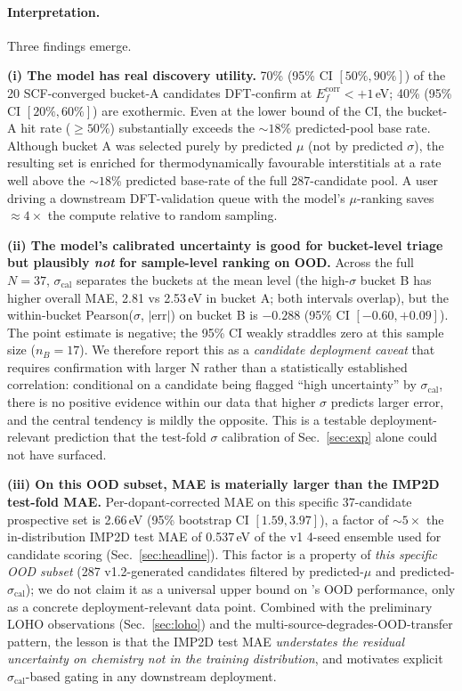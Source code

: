 \paragraph{Interpretation.}
Three findings emerge.

\textbf{(i) The model has real discovery utility.} 70\%
(95\% CI $[50\%, 90\%]$) of the 20 SCF-converged bucket-A candidates
DFT-confirm at $E_f^{\mathrm{corr}}<+1$\,eV; 40\% (95\% CI
$[20\%, 60\%]$) are exothermic. Even at the lower bound of the CI,
the bucket-A hit rate ($\ge 50\%$) substantially exceeds the
$\sim 18\%$ predicted-pool base rate. Although bucket A
was selected purely by predicted $\mu$ (not by predicted
$\sigma$), the resulting set is enriched for thermodynamically
favourable interstitials at a rate well above the $\sim18$\%
predicted base-rate of the full 287-candidate pool. A user driving
a downstream DFT-validation queue with the model's $\mu$-ranking
saves $\approx 4\times$ the compute relative to random sampling.

\textbf{(ii) The model's calibrated uncertainty is good for
bucket-level triage but plausibly \emph{not} for sample-level
ranking on OOD.} Across the full $N=37$, $\sigma_{\mathrm{cal}}$
separates the buckets at the mean level (the high-$\sigma$ bucket B
has higher overall MAE, 2.81 vs 2.53\,eV in bucket A; both intervals
overlap), but the within-bucket Pearson($\sigma$, $|\mathrm{err}|$)
on bucket B is $-0.288$ (95\% CI $[-0.60, +0.09]$). The point
estimate is negative; the 95\% CI weakly straddles zero at this
sample size ($n_B=17$). We therefore report this as a \emph{candidate
deployment caveat} that requires confirmation with larger N rather
than a statistically established correlation: conditional on a
candidate being flagged ``high uncertainty'' by $\sigma_{\mathrm{cal}}$,
there is no positive evidence within our data that higher $\sigma$
predicts larger error, and the central tendency is mildly the
opposite. This is a testable deployment-relevant prediction that
the test-fold $\sigma$ calibration of Sec.~\ref{sec:exp} alone could
not have surfaced.

\textbf{(iii) On this OOD subset, MAE is materially larger than the
IMP2D test-fold MAE.} Per-dopant-corrected MAE on this specific
37-candidate prospective set is 2.66\,eV (95\% bootstrap CI
$[1.59, 3.97]$), a factor of $\sim 5\times$ the
in-distribution IMP2D test MAE of 0.537\,eV of the v1 4-seed
ensemble used for candidate scoring (Sec.~\ref{sec:headline}).
This factor is a property of \emph{this specific OOD subset}
(287 v1.2-generated candidates filtered by predicted-$\mu$ and
predicted-$\sigma_{\mathrm{cal}}$); we do not claim it as a
universal upper bound on \modelname's OOD performance, only as a
concrete deployment-relevant data point. Combined with the
preliminary LOHO observations (Sec.~\ref{sec:loho}) and the
multi-source-degrades-OOD-transfer pattern, the lesson is that
the IMP2D test MAE \emph{understates the residual uncertainty
on chemistry not in the training distribution}, and motivates
explicit $\sigma_{\mathrm{cal}}$-based gating in any downstream
deployment.


